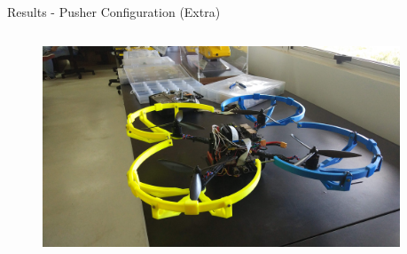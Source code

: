 \begin{frame}{Results - Pusher Configuration (Extra)}
        \begin{columns}
                \begin{column}{0.5\textwidth}
                        \begin{figure}
                                \centering
                                \includegraphics[width=1\textwidth]{img/protection.jpg}
                                \label{fig:prot}
                            \end{figure}
                \end{column}
                \begin{column}{0.5\textwidth}  %

                \end{column}
            \end{columns}
\end{frame}

